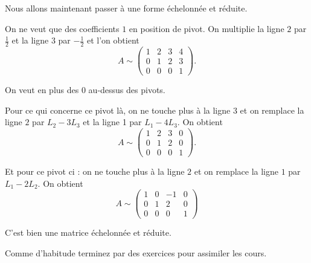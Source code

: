 \change
Nous allons maintenant passer à une forme échelonnée et réduite.

\change
On ne veut que des coefficients $1$ en position de pivot.
 On multiplie la ligne $2$ par $\frac12$ 
et la ligne $3$ par $-\frac12$ et l'on obtient
$$A\sim\begin{pmatrix}1&2&3&4\\
0&1&2&3\\
0&0&0&1
\end{pmatrix}.$$

\change
On veut en plus des $0$ au-dessus des pivots.

Pour ce qui concerne ce pivot là,
on ne touche plus à la ligne $3$ et on remplace la ligne $2$ par
$ L_2-3L_3$ et la ligne 1 par $ L_1 - 4L_3$.
On obtient
$$A\sim\begin{pmatrix}1&2&3&0\\
0&1&2&0\\
0&0&0&1
\end{pmatrix}.$$

\change
Et pour ce pivot ci : on ne touche plus à la ligne $2$ 
et on remplace la ligne $1$ par $ L_1-2L_2$. On obtient
$$A\sim\begin{pmatrix}1&0&-1&0\\
0&1&2&0\\
0&0&0&1
\end{pmatrix}$$

\change

C'est bien une matrice échelonnée et réduite.



\diapo


Comme d'habitude terminez par des exercices pour assimiler les cours.



